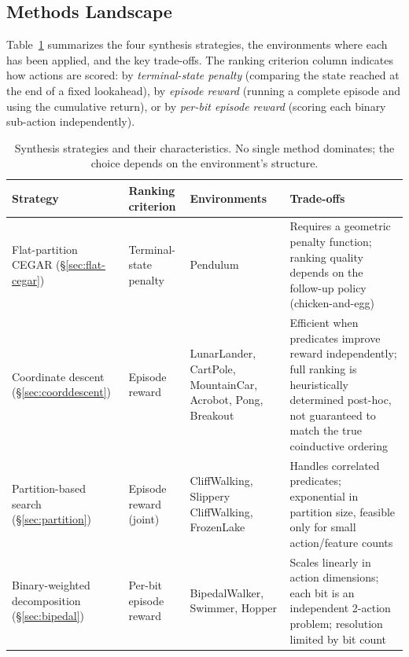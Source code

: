 \documentclass[9pt,a4paper]{article}
\theoremstyle{plain}
\theoremstyle{definition}
\theoremstyle{remark}
\begin{document}
\subsection{Methods Landscape}

Table~\ref{tab:methods} summarizes the four synthesis strategies,
the environments where each has been applied, and the key
trade-offs.  The ranking criterion column indicates how actions
are scored: by \emph{terminal-state penalty} (comparing the state
reached at the end of a fixed lookahead), by \emph{episode reward}
(running a complete episode and using the cumulative return), or
by \emph{per-bit episode reward} (scoring each binary sub-action
independently).

\begin{table}[t]
\centering
\small
\begin{tabular}{@{}p{3.2cm}p{2.5cm}p{2.8cm}p{4.5cm}@{}}
\toprule
\textbf{Strategy} & \textbf{Ranking criterion} & \textbf{Environments} &
  \textbf{Trade-offs} \\
\midrule
Flat-partition CEGAR
  (\S\ref{sec:flat-cegar})
  & Terminal-state penalty
  & Pendulum
  & Requires a geometric penalty function; ranking quality depends
    on the follow-up policy (chicken-and-egg) \\
\addlinespace
Coordinate descent
  (\S\ref{sec:coorddescent})
  & Episode reward
  & LunarLander, CartPole, MountainCar, Acrobot, Pong, Breakout
  & Efficient when predicates improve reward independently;
    full ranking is heuristically determined post-hoc, not
    guaranteed to match the true coinductive ordering \\
\addlinespace
Partition-based search
  (\S\ref{sec:partition})
  & Episode reward (joint)
  & CliffWalking, Slippery CliffWalking, FrozenLake
  & Handles correlated predicates; exponential in partition
    size, feasible only for small action/feature counts \\
\addlinespace
Binary-weighted decomposition
  (\S\ref{sec:bipedal})
  & Per-bit episode reward
  & BipedalWalker, Swimmer, Hopper
  & Scales linearly in action dimensions; each bit is an
    independent 2-action problem; resolution limited by
    bit count \\
\bottomrule
\end{tabular}
\caption{Synthesis strategies and their characteristics.  No single
method dominates; the choice depends on the environment's structure.}
\label{tab:methods}
\end{table}

\end{document}
